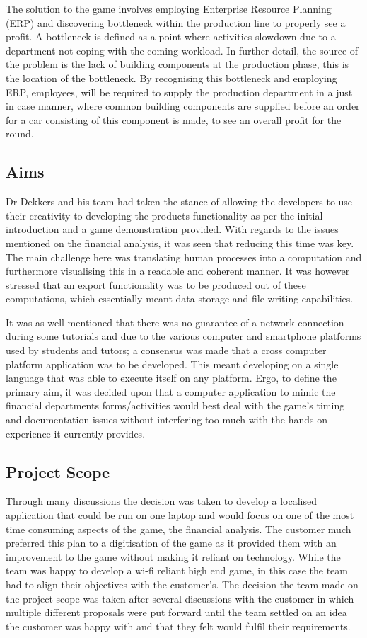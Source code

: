 \documentclass{l3proj}
\begin{document}
The solution to the game involves employing Enterprise Resource Planning (ERP) and discovering bottleneck within the production line to properly see a profit. A bottleneck is defined as a point where activities slowdown due to a department not coping with the coming workload. In further detail, the source of the problem is the lack of building components at the production phase, this is the location of the bottleneck. By recognising this bottleneck and employing ERP, employees, will be required to supply the production department in a just in case manner, where common building components are supplied before an order for a car consisting of this component is made, to see an overall profit for the round.

\subsection{Aims}
Dr Dekkers and his team had taken the stance of allowing the developers to use their creativity to developing the products functionality as per the initial introduction and a game demonstration provided. With regards to the issues mentioned on the financial analysis, it was seen that reducing this time was key. The main challenge here was translating human processes into a computation and furthermore visualising this in a readable and coherent manner. It was however stressed that an export functionality was to be produced out of these computations, which essentially meant data storage and file writing capabilities.
    
It was as well mentioned that there was no guarantee of a network connection during some tutorials and due to the various computer and smartphone platforms used by students and tutors; a consensus was made that a cross computer platform application was to be developed. This meant developing on a single language that was able to execute itself on any platform.
Ergo, to define the primary aim, it was decided upon that a computer application to mimic the financial departments forms/activities would best deal with the game's timing and documentation issues without interfering too much with the hands-on experience it currently provides.

\subsection{Project Scope}
 Through many discussions the decision was taken to develop a localised application that could be run on one laptop and would focus on one of the most time consuming aspects of the game, the financial analysis. The customer much preferred this plan to a digitisation of the game as it provided them with an improvement to the game without making it reliant on technology. While the team was happy to develop a wi-fi reliant high end game, in this case the team had to align their objectives with the customer's. The decision the team made on the project scope was taken after several discussions with the customer in which multiple different proposals were put forward until the team settled on an idea the customer was happy with and that they felt would fulfil their requirements.
\end{document}
